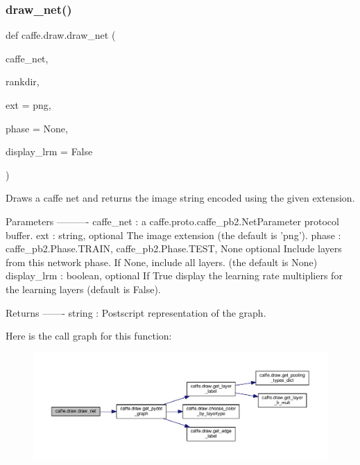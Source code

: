\subsubsection{\texorpdfstring{draw\+\_\+net()}{draw\_net()}}
{\footnotesize\ttfamily def caffe.\+draw.\+draw\+\_\+net (\begin{DoxyParamCaption}\item[{}]{caffe\+\_\+net,  }\item[{}]{rankdir,  }\item[{}]{ext = {\ttfamily \textquotesingle{}png\textquotesingle{}},  }\item[{}]{phase = {\ttfamily None},  }\item[{}]{display\+\_\+lrm = {\ttfamily False} }\end{DoxyParamCaption})}

\begin{DoxyVerb}Draws a caffe net and returns the image string encoded using the given
extension.

Parameters
----------
caffe_net : a caffe.proto.caffe_pb2.NetParameter protocol buffer.
ext : string, optional
    The image extension (the default is 'png').
phase : {caffe_pb2.Phase.TRAIN, caffe_pb2.Phase.TEST, None} optional
    Include layers from this network phase.  If None, include all layers.
    (the default is None)
display_lrm : boolean, optional
    If True display the learning rate multipliers for the learning layers
    (default is False).

Returns
-------
string :
    Postscript representation of the graph.
\end{DoxyVerb}
 Here is the call graph for this function\+:
\nopagebreak
\begin{figure}[H]
\begin{center}
\leavevmode
\includegraphics[width=350pt]{namespacecaffe_1_1draw_af1c2f41e9d66bae6814590e8c59f64c6_cgraph}
\end{center}
\end{figure}
\mbox{\label{namespacecaffe_1_1draw_a1955d119b9b325ea2ad20254b3dc80e3}} 
